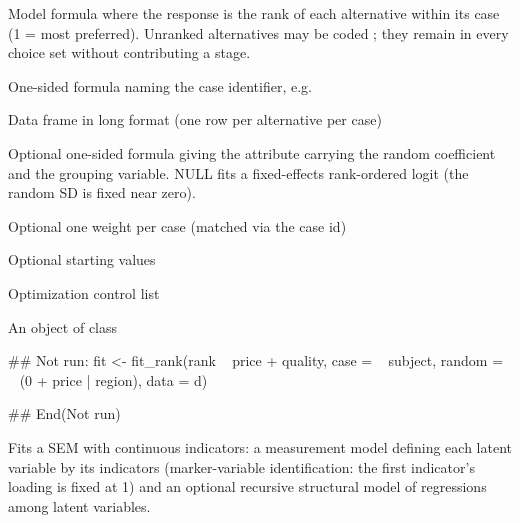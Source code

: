 \documentclass[a4paper]{book}
\begin{document}
\begin{Arguments}
\begin{ldescription}
\item[\code{formula}] Model formula  where the response is
the rank of each alternative within its case (1 = most preferred).
Unranked alternatives may be coded ; they remain in every
choice set without contributing a stage.

\item[\code{case}] One-sided formula naming the case identifier, e.g. 

\item[\code{data}] Data frame in long format (one row per alternative per case)

\item[\code{random}] Optional one-sided formula 
giving the attribute carrying the random coefficient and the grouping
variable. NULL fits a fixed-effects rank-ordered logit (the random SD
is fixed near zero).

\item[\code{weights}] Optional one weight per case (matched via the case id)

\item[\code{start}] Optional starting values

\item[\code{control}] Optimization control list
\end{ldescription}
\end{Arguments}
%
\begin{Value}
An object of class 
\end{Value}
%
\begin{Examples}
\begin{ExampleCode}
## Not run: 
fit <- fit_rank(rank ~ price + quality, case = ~ subject,
                random = ~ (0 + price | region), data = d)

## End(Not run)

\end{ExampleCode}
\end{Examples}
%
\begin{Description}
Fits a SEM with continuous indicators: a measurement model defining each
latent variable by its indicators (marker-variable identification: the
first indicator's loading is fixed at 1) and an optional recursive
structural model of regressions among latent variables.
\end{Description}
\end{document}
